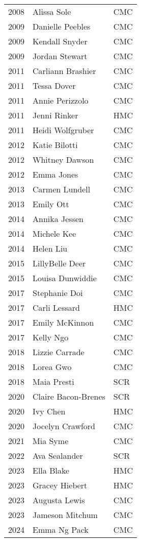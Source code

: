 \begin{longtable}{l l l}
    2008 & Alissa Sole & CMC \\
    2009 & Danielle Peebles & CMC \\
    2009 & Kendall Snyder & CMC \\
    2009 & Jordan Stewart & CMC \\
    2011 & Carliann Brashier & CMC \\
    2011 & Tessa Dover & CMC \\
    2011 & Annie Perizzolo & CMC \\
    2011 & Jenni Rinker & HMC \\
    2011 & Heidi Wolfgruber & CMC \\
    2012 & Katie Bilotti & CMC \\
    2012 & Whitney Dawson & CMC \\
    2012 & Emma Jones & CMC \\
    2013 & Carmen Lundell & CMC \\
    2013 & Emily Ott & CMC \\
    2014 & Annika Jessen & CMC \\
    2014 & Michele Kee & CMC \\
    2014 & Helen Liu & CMC \\
    2015 & LillyBelle Deer & CMC \\
    2015 & Louisa Dunwiddie & CMC \\
    2017 & Stephanie Doi & CMC \\
    2017 & Carli Lessard & HMC \\
    2017 & Emily McKinnon & CMC \\
    2017 & Kelly Ngo & CMC \\
    2018 & Lizzie Carrade & CMC \\
    2018 & Lorea Gwo & CMC \\
    2018 & Maia Presti & SCR \\
    2020 & Claire Bacon-Brenes & SCR \\
    2020 & Ivy Chen & HMC \\
    2020 & Jocelyn Crawford & CMC \\
    2021 & Mia Syme & CMC \\
    2022 & Ava Sealander & SCR \\
    2023 & Ella Blake & HMC \\
    2023 & Gracey Hiebert & HMC \\
    2023 & Augusta Lewis & CMC \\
    2023 & Jameson Mitchum & CMC \\
    2024 & Emma Ng Pack & CMC \\
\bottomrule
\end{longtable}

